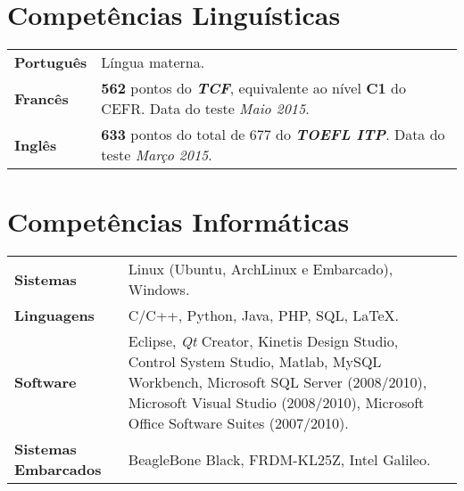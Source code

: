 \documentclass[10pt, a4paper]{article}
\begin{document}



\section{Competências Linguísticas}

\begin{tabular}{p{} p{}}

\textbf{Português} & Língua materna.  \\ 

\textbf{Francês} & \textbf{562} pontos do \textbf{\textit{TCF}},
equivalente ao nível \textbf{C1} do CEFR. Data do teste \textit{Maio
2015}.\\

\textbf{Inglês} & \textbf{633} pontos do total de 677 do \textbf{\textit{TOEFL
ITP}}. Data do teste \textit{Março 2015}. \\  

\end{tabular}


\section{Competências Informáticas} 

\begin{tabular}{p{} p{}}

 \textbf{Sistemas} & Linux (Ubuntu, ArchLinux e Embarcado), Windows.  \\ 

 \textbf{Linguagens} & C/C++, Python, Java, PHP,  SQL, \LaTeX.  \\
 
 \textbf{Software} & Eclipse, \textit{Qt} Creator, Kinetis Design Studio,
 Control System Studio, Matlab, MySQL Workbench, Microsoft SQL Server (2008/2010), Microsoft
 Visual Studio (2008/2010),  Microsoft Office Software Suites (2007/2010).\\
 
 \textbf{Sistemas \newline Embarcados} & BeagleBone Black, FRDM-KL25Z, Intel
 Galileo. \\
 
\end{tabular}


\end{document}
